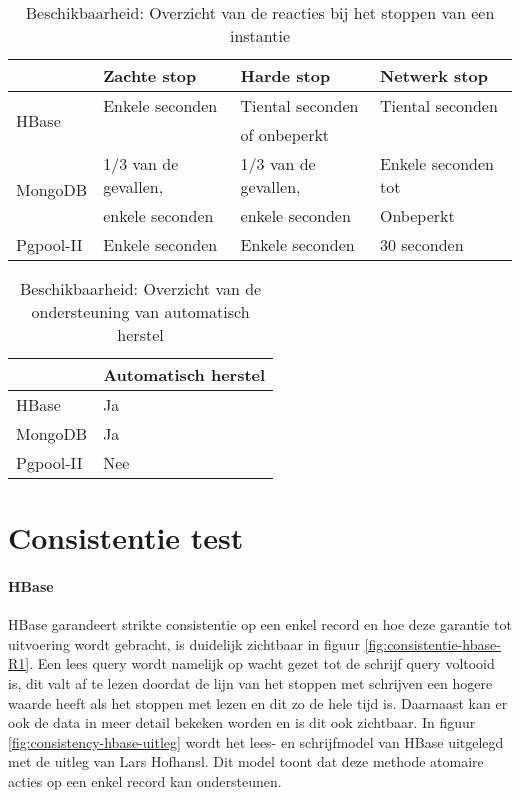 \begin{table}[htbp]
  \centering
    \begin{tabular}{l | lll}
          & Zachte stop & Harde stop & Netwerk stop \\
    \hline
    \multirow{2}{*}{HBase} & Enkele seconden & Tiental seconden & Tiental seconden \\
    & & of onbeperkt&  \\
    \multirow{2}{*}{MongoDB} & 1/3 van de gevallen, & 1/3 van de gevallen, & Enkele seconden tot \\
    & enkele seconden & enkele seconden & Onbeperkt\\
    Pgpool-II & Enkele seconden & Enkele seconden & 30 seconden \\
    \end{tabular}%
    \caption{Beschikbaarheid: Overzicht van de reacties bij het stoppen van een instantie }
  \label{table:beschikbaarheid-stop-resultaat}%
\end{table}

\begin{table}[htbp]
  \centering
    \begin{tabular}{l|l}
          & Automatisch herstel \\
    \hline
    HBase & Ja \\
    MongoDB & Ja \\
    Pgpool-II & Nee \\
    \end{tabular}%
      \caption{Beschikbaarheid: Overzicht van de ondersteuning van automatisch herstel}
  \label{table:beschikbaarheid-herstel-resultaat}%
\end{table}%



\section{Consistentie test}
\paragraph{HBase} HBase garandeert strikte consistentie op een enkel record en hoe deze garantie tot uitvoering wordt gebracht, is duidelijk zichtbaar in figuur \ref{fig:consistentie-hbase-R1}. Een lees query wordt namelijk op wacht gezet tot de schrijf query voltooid is, dit valt af te lezen doordat de lijn van het stoppen met schrijven een hogere waarde heeft als het stoppen met lezen en dit zo de hele tijd is. Daarnaast kan er ook de data in meer detail bekeken worden en is dit ook zichtbaar. In figuur \ref{fig:consistency-hbase-uitleg} wordt het lees- en schrijfmodel van HBase uitgelegd met de uitleg van Lars Hofhansl\cite{hbase-acid}. Dit model toont dat deze methode atomaire acties op een enkel record kan ondersteunen.  

